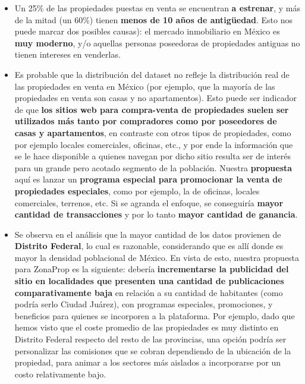 \documentclass[
10pt, %
a4paper, %
oneside, %
headinclude,footinclude, %
BCOR5mm, %
]{scrartcl}
\begin{document}
\begin{itemize}
        \item Un 25\% de las propiedades puestas en venta se encuentran \textbf{a estrenar}, y m\'as de la mitad (un 60\%) tienen \textbf{menos de 10 años de antigüedad}. Esto nos puede marcar dos posibles causas): el mercado inmobiliario en M\'exico es \textbf{muy moderno}, y/o aquellas personas poseedoras de propiedades antiguas no tienen intereses en venderlas.
        
        \item Es probable que la distribución del dataset no refleje la distribución real de las propiedades en venta en México (por ejemplo, que la mayoría de las propiedades en venta son casas y no apartamentos). Esto puede ser indicador de que \textbf{los sitios web para compra-venta de propiedades suelen ser utilizados más tanto por compradores como por poseedores de casas y apartamentos}, en contraste con otros tipos de propiedades, como por ejemplo locales comerciales, oficinas, etc., y por ende la información que se le hace disponible a quienes navegan por dicho sitio resulta ser de interés para un grande pero acotado segmento de la población. Nuestra \textbf{propuesta} aqu\'i es lanzar un \textbf{programa especial para promocionar la venta de propiedades especiales}, como por ejemplo, la de oficinas, locales comerciales, terrenos, etc. Si se agranda el enfoque, se conseguir\'ia \textbf{mayor cantidad de transacciones} y por lo tanto \textbf{mayor cantidad de ganancia}.
        
        \item Se observa en el an\'alisis que la mayor cantidad de los datos provienen de \textbf{Distrito Federal}, lo cual es razonable, considerando que es allí donde es mayor la densidad poblacional de México. En vista de esto, nuestra propuesta para ZonaProp es la siguiente: debería \textbf{incrementarse la publicidad del sitio en localidades que presenten una cantidad de publicaciones comparativamente baja} en relación a su cantidad de habitantes (como podría serlo Ciudad Juárez), con programas especiales, promociones, y beneficios para quienes se incorporen a la plataforma. Por ejemplo, dado que hemos visto que el coste promedio de las propiedades es muy distinto en Distrito Federal respecto del resto de las provincias, una opci\'on podr\'ia ser personalizar las comisiones que se cobran dependiendo de la ubicaci\'on de la propiedad, para animar a los sectores m\'as aislados a incorporarse por un costo relativamente bajo.
        
        
    \end{itemize}

\let\thefootnote\relax{}
    
\end{document}
